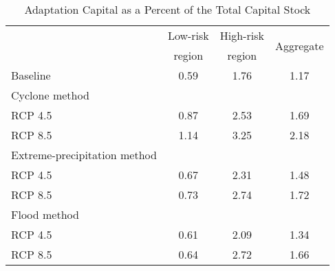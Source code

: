 \begin{table}[H] 
\singlespace 
\center 
\caption{Adaptation Capital as a Percent of the Total Capital Stock} \label{tab:adaptation_capital}
\vspace{-.1in} 
\begin{tabular}{l c c c}\hline 
\hline 
 	& Low-risk & High-risk & \multirow{2}{*}{Aggregate} \\[-0.5ex] 
 	& region & region &  \\ 
\hline 
Baseline &     0.59 &     1.76 &     1.17  \\Cyclone method \\ 
\hspace{1em} RCP 4.5  &     0.87 &     2.53 &     1.69  \\\hspace{1em} RCP 8.5 &     1.14 &     3.25 &     2.18  \\Extreme-precipitation method \\ 
\hspace{1em} RCP 4.5 &     0.67 &     2.31 &     1.48  \\\hspace{1em} RCP 8.5&     0.73 &     2.74 &     1.72  \\Flood method \\ 
\hspace{1em} RCP 4.5&     0.61 &     2.09 &     1.34  \\\hspace{1em} RCP 8.5 &     0.64 &     2.72 &     1.66  \\\hline 
\end{tabular}
\end{table} 
